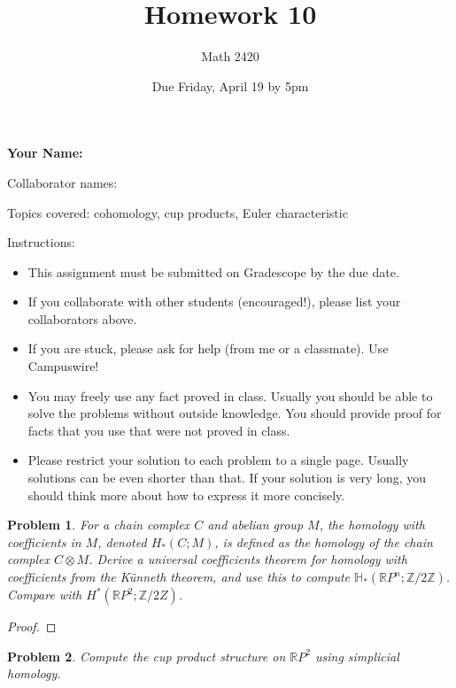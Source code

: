\documentclass[11pt]{article}
\author{Math 2420}
\date{Due Friday, April 19 by 5pm}
\title{Homework 10}
\newtheorem{problem}{Problem}
\begin{document}
\maketitle

{\bf\Large Your Name:} 

Collaborator names: 


\vspace{.3in}
Topics covered: cohomology, cup products, Euler characteristic

Instructions: 
\begin{itemize}
\item This assignment must be submitted on Gradescope by the due date. 
\item If you collaborate with other students (encouraged!), please list your collaborators above. 
\item If you are stuck, please ask for help (from me or a classmate). Use Campuswire!  
\item You may freely use any fact proved in class. Usually you should be able to solve the problems without outside knowledge. You should provide proof for facts that you use that were not proved in class. 
\item Please restrict your solution to each problem to a single page. Usually solutions can be even shorter than that. If your solution is very long, you should think more about how to express it more concisely.
\end{itemize}
\pagebreak 


\begin{problem}
For a chain complex $C$ and abelian group $M$, the homology with coefficients in $M$, denoted $H_*(C;M)$, is defined as the homology of the chain complex $C\otimes M$. Derive a universal coefficients theorem for homology with coefficients from the K\"unneth theorem, and use this to compute $\mathbb H_*(\mathbb RP^n;\mathbb Z/2\mathbb Z)$. Compare with $H^*(\mathbb RP^2;\mathbb Z/2Z)$.
\end{problem}

\begin{proof}

\end{proof}

\pagebreak 

\begin{problem}
Compute the cup product structure on $\mathbb RP^2$ using simplicial homology.
\end{problem}
\end{document}
